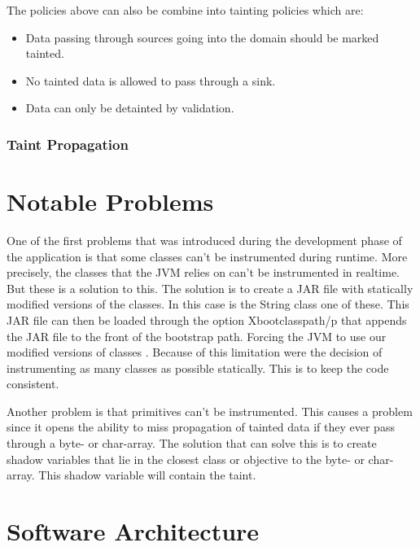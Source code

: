 The policies above can also be combine into tainting policies which are:

\hfill
\begin{itemize}
  \item Data passing through sources going into the domain should be marked tainted.
  \item No tainted data is allowed to pass through a sink. 
  \item Data can only be detainted by validation.
\end{itemize}
\hfill


\subsubsection{Taint Propagation}



\section{Notable Problems}
\label{NotableProblems}
One of the first problems that was introduced during the development phase of the application is that some classes can't be instrumented during runtime. More precisely, the classes that the JVM relies on can't be instrumented in realtime. But these is a solution to this. The solution is to create a JAR file with statically modified versions of the classes. In this case is the String class one of these. This JAR file can then be loaded through the option Xbootclasspath/p that appends the JAR file to the front of the bootstrap path. Forcing the JVM to use our modified versions of classes \parencite{xboot}. Because of this limitation were the decision of instrumenting as many classes as possible statically. This is to keep the code consistent.

Another problem is that primitives can't be instrumented. This causes a problem since it opens the ability to miss propagation of tainted data if they ever pass through a byte- or char-array. The solution that can solve this is to create shadow variables that lie in the closest class or objective to the byte- or char-array. This shadow variable will contain the taint.


\section{Software Architecture}
\label{SoftwareArchitecture}

